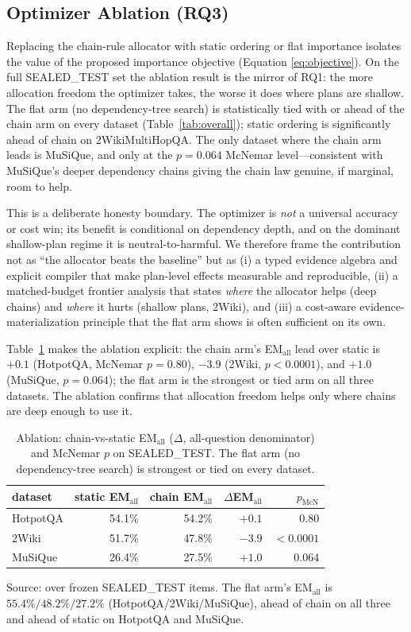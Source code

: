 \subsection{Optimizer Ablation (RQ3)}
Replacing the chain-rule allocator with static ordering or flat importance
isolates the value of the proposed importance objective (Equation
\ref{eq:objective}). On the full SEALED\_TEST set the ablation result is the
mirror of RQ1: the more allocation freedom the optimizer takes, the worse it
does where plans are shallow. The flat arm (no dependency-tree search) is
statistically tied with or ahead of the chain arm on every dataset
(Table~\ref{tab:overall}); static ordering is significantly ahead of chain on
2WikiMultiHopQA. The only dataset where the chain arm leads is MuSiQue, and
only at the $p{=}0.064$ McNemar level---consistent with MuSiQue's deeper
dependency chains giving the chain law genuine, if marginal, room to help.

This is a deliberate honesty boundary. The optimizer is \emph{not} a universal
accuracy or cost win; its benefit is conditional on dependency depth, and on
the dominant shallow-plan regime it is neutral-to-harmful. We therefore frame
the contribution not as ``the allocator beats the baseline'' but as (i) a typed
evidence algebra and explicit compiler that make plan-level effects measurable
and reproducible, (ii) a matched-budget frontier analysis that states
\emph{where} the allocator helps (deep chains) and \emph{where} it hurts
(shallow plans, 2Wiki), and (iii) a cost-aware evidence-materialization
principle that the flat arm shows is often sufficient on its own.

Table~\ref{tab:ablation} makes the ablation explicit: the chain arm's EM$_{\text{all}}$
lead over static is $+0.1$ (HotpotQA, McNemar $p{=}0.80$), $-3.9$ (2Wiki,
$p{<}0.0001$), and $+1.0$ (MuSiQue, $p{=}0.064$); the flat arm is the
strongest or tied arm on all three datasets. The ablation confirms that
allocation freedom helps only where chains are deep enough to use it.

\begin{table}[t]
\centering
\caption{Ablation: chain-vs-static EM$_{\text{all}}$ ($\Delta$, all-question
denominator) and McNemar $p$ on SEALED\_TEST. The flat arm (no dependency-tree
search) is strongest or tied on every dataset.}
\label{tab:ablation}
\small
\begin{tabular}{lrrrr}
\toprule
dataset & static EM$_{\text{all}}$ & chain EM$_{\text{all}}$ & $\Delta$EM$_{\text{all}}$ & $p_{\text{McN}}$ \\
\midrule
HotpotQA  & 54.1\% & 54.2\% & $+0.1$ & 0.80 \\
2Wiki     & 51.7\% & 47.8\% & $-3.9$ & $<0.0001$ \\
MuSiQue   & 26.4\% & 27.5\% & $+1.0$ & 0.064 \\
\bottomrule
\end{tabular}

{\footnotesize
Source:  over frozen SEALED\_TEST items. The flat arm's
EM$_{\text{all}}$ is $55.4\%/48.2\%/27.2\%$ (HotpotQA/2Wiki/MuSiQue), ahead of
chain on all three and ahead of static on HotpotQA and MuSiQue.}
\end{table}

